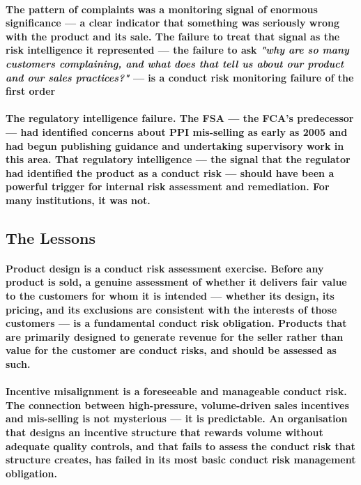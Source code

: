 \paragraph{The pattern of complaints was a monitoring signal of enormous significance — a clear indicator that something was seriously wrong with the product and its sale. The failure to treat that signal as the risk intelligence it represented — the failure to ask \textit{"why are so many customers complaining, and what does that tell us about our product and our sales practices?"} — is a conduct risk monitoring failure of the first order}
\paragraph{\textbf{The regulatory intelligence failure}. The FSA — the FCA's predecessor — had identified concerns about PPI mis-selling as early as 2005 and had begun publishing guidance and undertaking supervisory work in this area. That regulatory intelligence — the signal that the regulator had identified the product as a conduct risk — should have been a powerful trigger for internal risk assessment and remediation. For many institutions, it was not.}

\subsection{The Lessons}
\paragraph{\textbf{Product design is a conduct risk assessment exercise}. Before any product is sold, a genuine assessment of whether it delivers fair value to the customers for whom it is intended — whether its design, its pricing, and its exclusions are consistent with the interests of those customers — is a fundamental conduct risk obligation. Products that are primarily designed to generate revenue for the seller rather than value for the customer are conduct risks, and should be assessed as such.}
\paragraph{\textbf{Incentive misalignment is a foreseeable and manageable conduct risk}. The connection between high-pressure, volume-driven sales incentives and mis-selling is not mysterious — it is predictable. An organisation that designs an incentive structure that rewards volume without adequate quality controls, and that fails to assess the conduct risk that structure creates, has failed in its most basic conduct risk management obligation.}
